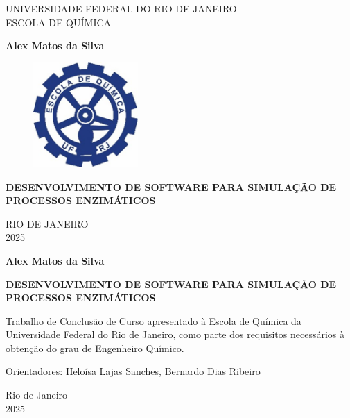 \documentclass[12pt,oneside]{report}
\begin{document}
\onehalfspacing

\begin{titlepage}
    \begin{center}
        \large
        UNIVERSIDADE FEDERAL DO RIO DE JANEIRO \\
        ESCOLA DE QUÍMICA

        \vspace{2cm}

        \textbf{Alex Matos da Silva}

        \vspace{2cm}

        \begin{figure}[htp]
            \centering
            \includegraphics[width=4cm]{Logo-EQ.jpg}
        \end{figure}

        \vspace{2cm}

        \textbf{\Large DESENVOLVIMENTO DE SOFTWARE PARA SIMULAÇÃO DE PROCESSOS ENZIMÁTICOS}

        \vfill

        RIO DE JANEIRO \\
        2025
    \end{center}
\end{titlepage}

\begin{titlepage}
    \begin{center}
        \textbf{Alex Matos da Silva}

        \vfill

        \textbf{\Large DESENVOLVIMENTO DE SOFTWARE PARA SIMULAÇÃO DE PROCESSOS ENZIMÁTICOS}

        \vfill

        Trabalho de Conclusão de Curso apresentado à Escola de Química da Universidade Federal do Rio de Janeiro, como parte dos requisitos necessários à obtenção do grau de Engenheiro Químico.

        \vfill

        Orientadores: Heloísa Lajas Sanches, Bernardo Dias Ribeiro

        \vfill

        Rio de Janeiro \\
        2025
    \end{center}
\end{titlepage}
\end{document}
